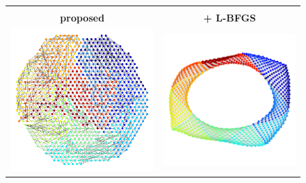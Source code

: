 \documentclass[dvipdfmx,journal]{IEEEtran}
\begin{document}
\begin{figure}[t]
\begin{tabular}{cc}
\begin{minipage}{0.45\columnwidth}
        \end{minipage}                                   \\
        \large{\textbf{\textsf{proposed}}}                                 & \large{\textbf{\textsf{+ L-BFGS}}} \\
        \begin{minipage}{0.45\columnwidth}
            \centering
            \includegraphics[width=0.85\columnwidth]{jagmesh1/jagmesh1_SN.png}
        \end{minipage}
                                                                           &
        \begin{minipage}{0.45\columnwidth}
            \centering
            \includegraphics[width=0.85\columnwidth]{jagmesh1/jagmesh1_SN_L_BFGS.png}

\end{minipage}
\end{tabular}
\end{figure}
\end{document}
